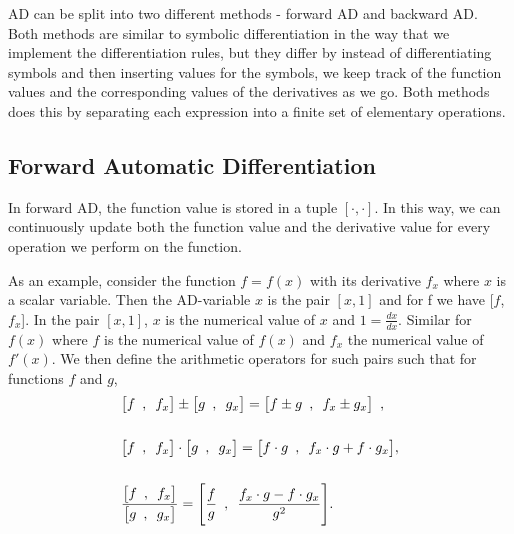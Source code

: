 AD can be split into two different methods - forward AD and backward AD. Both methods are similar to symbolic differentiation in the way that we implement the differentiation rules, but they differ by instead of differentiating symbols and then inserting values for the symbols, we keep track of the function values and the corresponding values of the derivatives as we go. Both methods does this by separating each expression into a finite set of elementary operations. 

\subsection{Forward Automatic Differentiation}
In forward AD, the function value is stored in a tuple $[\cdot, \cdot]$. In this way, we can continuously update both the function value and the derivative value for every operation we perform on the function. 

As an example, consider the function $f = f(x)$ with its derivative $f_x$ where $x$ is a scalar variable. Then the AD-variable $x$ is the pair $[x, 1]$ and for f we have [$f$, $f_x$]. In the pair $[x,1]$, $x$ is the numerical value of $x$ and $1 = \frac{dx}{dx}$. Similar for $f(x)$ where $f$ is the numerical value of $f(x)$ and $f_x$ the numerical value of $f'(x)$.  We then define the arithmetic operators for such pairs such that for functions $f$ and $g$,
\begin{equation}
    \begin{aligned}
    &\big[f \hspace{0.5em} , \hspace{0.5em}  f_x\big] \pm \big[g \hspace{0.5em} , \hspace{0.5em}  g_x\big] = \big[f \pm g \hspace{0.5em} , \hspace{0.5em}  f_x \pm g_x\big] \hspace{0.5em}, \\\\
    &\big[f \hspace{0.5em} , \hspace{0.5em}  f_x\big]\cdot \big[g \hspace{0.5em} , \hspace{0.5em}  g_x\big] = \big[f\cdot g \hspace{0.5em} , \hspace{0.5em}  f_x\cdot g + f\cdot g_x\big],\\\\
    &\frac{\big[f \hspace{0.5em} , \hspace{0.5em}  f_x\big]}{\big[g \hspace{0.5em} , \hspace{0.5em}  g_x\big]} = \Bigg[\frac{f}{g} \hspace{0.5em} , \hspace{0.5em}  \frac{f_x\cdot g - f\cdot g_x}{g^2}\Bigg].
\end{aligned}
\label{eq:arithmeticOperators}
\end{equation}

